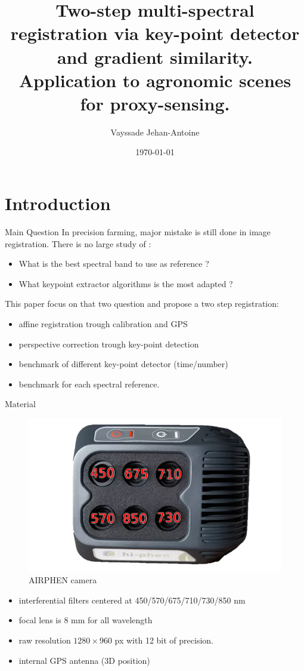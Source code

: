 \documentclass{beamer}
\title{
	Two-step multi-spectral registration via key-point detector and gradient similarity. \\
	\vspace{1em}
	Application to agronomic scenes for proxy-sensing.
}
\date{\today}
\author{Vayssade Jehan-Antoine}
\institute{AgroSup Dijon, France \\ Pole GestAd in Precision Farming group \\ \url{jehan-antoine.vayssade@inra.fr}}
\begin{document}
	\maketitle
	\section{Introduction}
	
		\begin{frame}{Main Question}
			In precision farming, major mistake is still done in image registration.
			There is no large study of :
			
			\begin{itemize}
				\item What is the best spectral band to use as reference ?
				\item What keypoint extractor algorithms is the most adapted ?
			\end{itemize}
		
			This paper focus on that two question and propose a two step registration:
			
			\begin{itemize}
				\item affine registration trough calibration and GPS
				\item perspective correction trough key-point detection
				\item benchmark of different key-point detector (time/number)
				\item benchmark for each spectral reference.
			\end{itemize}
		\end{frame}
	
		\begin{frame}{Material}
			\begin{figure}
				\includegraphics[width=0.4\linewidth]{../figures/airphen-detail4.png}
				\caption{AIRPHEN camera}
			\end{figure}
			\begin{itemize}
				\item interferential filters centered at 450/570/675/710/730/850 nm
				\item focal lens is 8 mm for all wavelength
				\item raw resolution $1280 \times 960$ px with 12 bit of precision.
				\item internal GPS antenna (3D position)
			\end{itemize}
		\end{frame}
	
\end{document}
